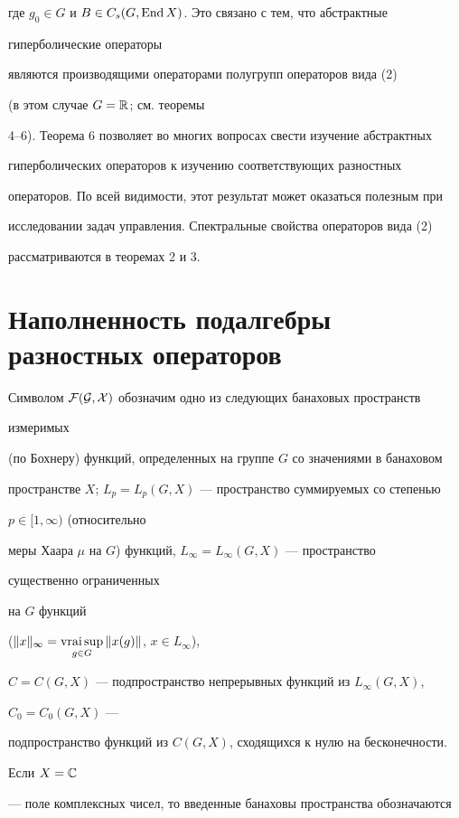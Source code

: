 где $g_0\in G$ и $B\in C_s(G,\operatorname{End} X)$. Это связано с тем, что абстрактные 


гиперболические операторы 


являются производящими операторами полугрупп операторов вида (2)


(в этом случае $G=\Bbb R$; см. теоремы 


4--6). Теорема 6 позволяет во многих вопросах свести изучение абстрактных 


гиперболических операторов к изучению соответствующих разностных 


операторов. По всей видимости, этот результат может оказаться полезным при 


исследовании задач управления. Спектральные свойства операторов вида (2) 


рассматриваются в теоремах 2 и 3. 


 


\section{Наполненность подалгебры разностных операторов} 


 


Символом $\cal F(G,X)$ обозначим одно из следующих банаховых пространств 


измеримых 


(по Бохнеру) функций, определенных на группе $G$ со значениями в банаховом 


пространстве $X$; $L_p=L_p(G,X)$ --- пространство суммируемых со степенью 


$p\in[1,\infty)$ (относительно 


меры Хаара $\mu$ на $G$) функций, $L_\infty=L_\infty(G,X)$ --- пространство 


существенно ограниченных 


на $G$ функций


($\|x\|_{\infty}=\vraisup\limits_{g\in G}\|x(g)\|$, $x\in L_\infty$), 


$C=C(G,X)$ --- подпространство непрерывных функций из $L_\infty(G,X)$, 


$C_0=C_0(G,X)$ --- 


подпространство функций из $C(G,X)$, сходящихся к нулю на бесконечности. 


Если $X=\Bbb C$ 


--- поле комплексных чисел, то введенные банаховы пространства обозначаются 


